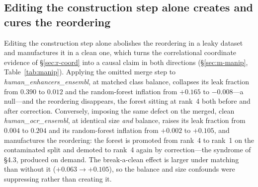 \documentclass[webpdf,modern,large,namedate]{oup-authoring-template}%
\begin{document}
\subsection{Editing the construction step alone creates and cures the reordering}\label{sec:r-manip}
Editing the construction step alone abolishes the reordering in a leaky dataset and manufactures it in a clean one, which turns the correlational coordinate evidence of \S\ref{sec:r-coord} into a causal claim in both directions (\S\ref{sec:m-manip}, Table~\ref{tab:manip}). Applying the omitted merge step to \textit{human\_enhancers\_ensembl}, at matched class balance, collapses its leak fraction from $0.390$ to $0.012$ and the random-forest inflation from $+0.165$ to $-0.008$---a null---and the reordering disappears, the forest sitting at rank~4 both before and after correction. Conversely, imposing the same defect on the merged, clean \textit{human\_ocr\_ensembl}, at identical size \emph{and} balance, raises its leak fraction from $0.004$ to $0.204$ and its random-forest inflation from $+0.002$ to $+0.105$, and manufactures the reordering: the forest is promoted from rank~4 to rank~1 on the contaminated split and demoted to rank~4 again by correction---the syndrome of \S4.3, produced on demand. The break-a-clean effect is larger under matching than without it ($+0.063\to+0.105$), so the balance and size confounds were suppressing rather than creating it.
\end{document}
